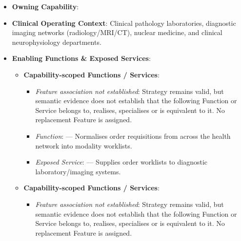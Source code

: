 \begin{itemize}

\item
\textbf{Owning Capability}: \texttt{}



\item
\textbf{Clinical Operating Context}: Clinical pathology laboratories, diagnostic imaging networks (radiology/\allowbreak{}MRI/\allowbreak{}CT), nuclear medicine, and clinical neurophysiology departments.



\item
\textbf{Enabling Functions \& Exposed Services}:


\begin{itemize}

\item
\textbf{Capability-scoped Functions /\allowbreak{} Services}:


\begin{itemize}

\item
\emph{Feature association not established}: Strategy \texttt{} remains valid, but semantic evidence does not establish that the following Function or Service belongs to, realises, specialises or is equivalent to it. No replacement Feature is assigned.



\item
\emph{Function}: \texttt{} — Normalises order requisitions from across the health network into modality worklists.



\item
\emph{Exposed Service}: \texttt{} — Supplies order worklists to diagnostic laboratory/\allowbreak{}imaging systems.



\end{itemize}


\item
\textbf{Capability-scoped Functions /\allowbreak{} Services}:


\begin{itemize}

\item
\emph{Feature association not established}: Strategy \texttt{} remains valid, but semantic evidence does not establish that the following Function or Service belongs to, realises, specialises or is equivalent to it. No replacement Feature is assigned.




\end{itemize}
\end{itemize}
\end{itemize}
